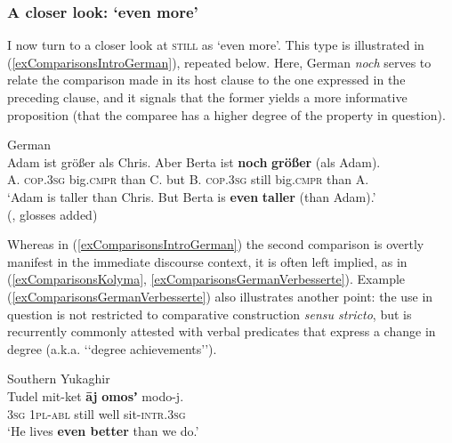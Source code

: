 {\subsubsection{A closer look: \lq even more\rq{}} I now turn to a closer look at  \textsc{still} as \lq even more\rq{}. This type is illustrated in (\ref{exComparisonsIntroGerman}), repeated below. Here, German \textit{noch} serves to relate the comparison made in its host clause to the one expressed in the preceding clause, and it signals that the former yields a more informative proposition (that the comparee has a higher degree of the property in question).

\begin{exe}
	German\\
	\gll Adam ist größer als Chris. Aber Berta ist \textbf{noch} \textbf{größer} (als Adam).\\
	A. \textsc{cop}.3\textsc{sg} big.\textsc{cmpr} than C. but B. \textsc{cop}.3\textsc{sg} still big.\textsc{cmpr} \phantom{(}than A.\\
	\glt \lq Adam is taller than Chris. But Berta is \textbf{even} \textbf{taller} (than Adam).\rq{}
	\\(\cite[9]{Umbach2009}, glosses added)
\end{exe}

\pagebreak
Whereas in (\ref{exComparisonsIntroGerman}) the second comparison is overtly manifest in the immediate discourse context, it is often left implied, as in (\ref{exComparisonsKolyma}, \ref{exComparisonsGermanVerbesserte}). Example (\ref{exComparisonsGermanVerbesserte}) also illustrates another point: the use in question is not restricted to comparative construction \textit{sensu stricto}, but is recurrently commonly attested with verbal predicates that express a change in degree (a.k.a. \lq\lq degree achievements\rq\rq).

\begin{exe}
	\ex Southern Yukaghir\label{exComparisonsKolyma}\\
	\gll Tudel mit-ket \textbf{āj} \textbf{omosʼ} modo-j.\\
	3\textsc{sg} 1\textsc{pl}-\textsc{abl} still well sit-\textsc{intr}.3\textsc{sg}\\
	\glt \lq He lives \textbf{even better} than we do.' \parencite[364]{Maslova2003}
	

\end{exe}}
